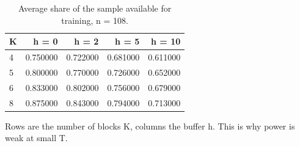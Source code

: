 \begin{table}[htbp]
\centering
\caption{Average share of the sample available for training, n = 108.}
\label{tab:tab05_sample_use}
\begin{threeparttable}
\begin{tabular}{lrrrr}
\toprule
K & h = 0 & h = 2 & h = 5 & h = 10 \\
\midrule
4 & 0.750000 & 0.722000 & 0.681000 & 0.611000 \\
5 & 0.800000 & 0.770000 & 0.726000 & 0.652000 \\
6 & 0.833000 & 0.802000 & 0.756000 & 0.679000 \\
8 & 0.875000 & 0.843000 & 0.794000 & 0.713000 \\
\bottomrule
\end{tabular}

\begin{tablenotes}[flushleft]\small
\item Rows are the number of blocks K, columns the buffer h. This is why power is weak at small T.
\end{tablenotes}
\end{threeparttable}
\end{table}